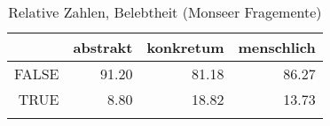 \begin{table}[ht]
\centering
\begin{tabular}{rrrr}
  \lsptoprule
 & abstrakt & konkretum & menschlich \\ 
  \midrule
FALSE & 91.20 & 81.18 & 86.27 \\ 
  TRUE & 8.80 & 18.82 & 13.73 \\ 
   \lspbottomrule
\end{tabular}
\caption{Relative Zahlen, Belebtheit  (Monseer Fragemente)} 
\end{table}
